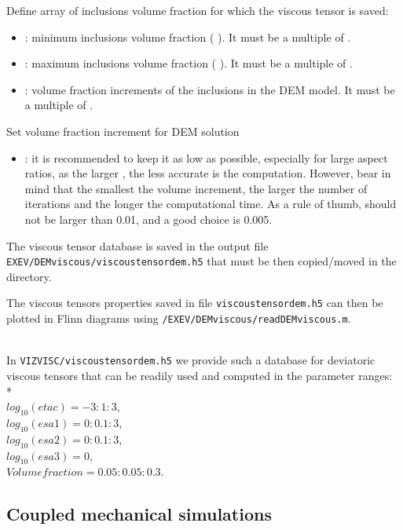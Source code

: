 Define array of inclusions volume fraction for which the viscous tensor is saved:
\begin{itemize}
    \item {}: minimum inclusions volume fraction ( ). It must be a multiple of .
    \item {}: maximum inclusions volume fraction ( ). It must be a multiple of .
    \item {}: volume fraction increments of the inclusions in the DEM model. It must be a multiple of . 
\end{itemize}

Set volume fraction increment for DEM solution
\begin{itemize}
    \item {}: it is recommended to keep it as low as possible, especially for large aspect ratios, as the larger , the less accurate is the computation. However, bear in mind that the smallest the volume increment, the larger the number of iterations and the longer the computational time. As a rule of thumb,  should not be larger than 0.01, and a good choice is 0.005.
\end{itemize}

The viscous tensor database is saved in the output file \texttt{EXEV/DEMviscous/viscoustensordem.h5} that must be then copied/moved in the \vizvisctitle{} directory.

The viscous tensors properties saved in file \texttt{viscoustensordem.h5} can then be plotted in Flinn diagrams using \texttt{/EXEV/DEMviscous/readDEMviscous.m}.

\\
In \texttt{VIZVISC/viscoustensordem.h5} we provide such a database for deviatoric viscous tensors that can be readily used and computed in the parameter ranges:\\* 
\\
$log_{10}(etac)=-3:1:3$,\\
$log_{10}(esa1)=0:0.1:3$,\\
$log_{10}(esa2)=0:0.1:3$,\\
$log_{10}(esa3)=0$,\\
$Volume fraction = 0.05:0.05:0.3$.
\vfill{}

\subsection{Coupled mechanical simulations}

